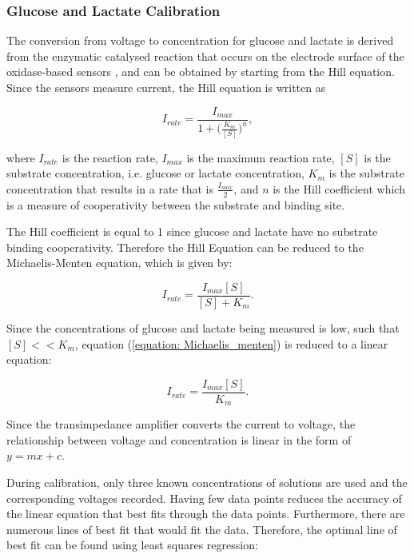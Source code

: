 \subsubsection{Glucose and Lactate Calibration}

The conversion from voltage to concentration for glucose and lactate is derived from the enzymatic catalysed reaction that occurs on the electrode surface of the oxidase-based sensors \cite{Patel:2011:10.1016/j.bios.2010.11.033, Rogers2017}, and can be obtained by starting from the Hill equation. Since the sensors measure current, the Hill equation is written as

\begin{equation}
    I_{rate} = \frac{I_{max}}{1 + \big( \frac{K_{m}}{[S]} \big)^{n}},
    \label{equation: Hill equation}
\end{equation}

\noindent where $I_{rate}$ is the reaction rate, $I_{max}$ is the maximum reaction rate, $[S]$ is the substrate concentration, i.e. glucose or lactate concentration, $K_{m}$ is the substrate concentration that results in a rate that is $\frac{I_{max}}{2}$, and $n$ is the Hill coefficient which is a measure of cooperativity between the substrate and binding site.

The Hill coefficient is equal to 1 since glucose and lactate have no substrate binding cooperativity. Therefore the Hill Equation can be reduced to the Michaelis-Menten equation, which is given by:

\begin{equation}
    I_{rate} = \frac{I_{max}[S]}{[S] + K_{m}}.
    \label{equation: Michaelis_menten}
\end{equation}

Since the concentrations of glucose and lactate being measured is low, such that $[S] << K_{m}$, equation (\ref{equation: Michaelis_menten}) is reduced to a linear equation:

\begin{equation}
    I_{rate} = \frac{I_{max}[S]}{K_{m}}.
    \label{equation: reduced Michaelis_menten}
\end{equation}

\noindent Since the transimpedance amplifier converts the current to voltage, the relationship between voltage and concentration is linear in the form of $y = mx + c$.

During calibration, only three known concentrations of solutions are used and the corresponding voltages recorded. Having few data points reduces the accuracy of the linear equation that best fits through the data points. Furthermore, there are numerous lines of best fit that would fit the data. Therefore, the optimal line of best fit can be found using least squares regression:


